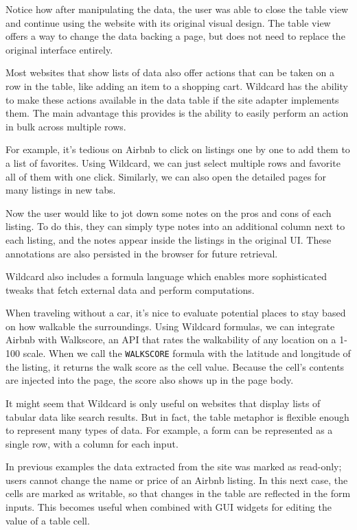 \documentclass[english,submission]{programming}
\begin{document}
Notice how after manipulating the data, the user was able to close the
table view and continue using the website with its original visual
design. The table view offers a way to change the data backing a page,
but does not need to replace the original interface entirely.

Most websites that show lists of data also offer actions that can be
taken on a row in the table, like adding an item to a shopping cart.
Wildcard has the ability to make these actions available in the data
table if the site adapter implements them. The main advantage this
provides is the ability to easily perform an action in bulk across
multiple rows.

For example, it's tedious on Airbnb to click on listings one by one to
add them to a list of favorites. Using Wildcard, we can just select
multiple rows and favorite all of them with one click. Similarly, we can
also open the detailed pages for many listings in new tabs.

Now the user would like to jot down some notes on the pros and cons of
each listing. To do this, they can simply type notes into an additional
column next to each listing, and the notes appear inside the listings in
the original UI. These annotations are also persisted in the browser for
future retrieval.

Wildcard also includes a formula language which enables more
sophisticated tweaks that fetch external data and perform computations.

When traveling without a car, it's nice to evaluate potential places to
stay based on how walkable the surroundings. Using Wildcard formulas, we
can integrate Airbnb with Walkscore, an API that rates the walkability
of any location on a 1-100 scale. When we call the \texttt{WALKSCORE}
formula with the latitude and longitude of the listing, it returns the
walk score as the cell value. Because the cell's contents are injected
into the page, the score also shows up in the page body.

It might seem that Wildcard is only useful on websites that display
lists of tabular data like search results. But in fact, the table
metaphor is flexible enough to represent many types of data. For
example, a form can be represented as a single row, with a column for
each input.

In previous examples the data extracted from the site was marked as
read-only; users cannot change the name or price of an Airbnb listing.
In this next case, the cells are marked as writable, so that changes in
the table are reflected in the form inputs. This becomes useful when
combined with GUI widgets for editing the value of a table cell.
\end{document}
